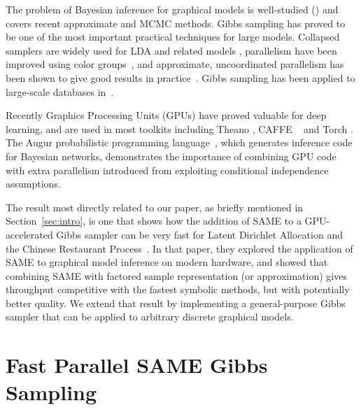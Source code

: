 \documentclass{article} %
\begin{document}
The problem of Bayesian inference for graphical models is  well-studied (\citet{Koller2009}) and \citet{Wainwright2008} covers
recent approximate and MCMC methods. Gibbs sampling has proved to be one of the most important practical
techniques for large models. Collapsed samplers are widely used for LDA and related models \cite{Griffiths_Steyvers},
parallelism have been improved using color groups~\citep{Gonzalez2011}, and approximate, uncoordinated parallelism has been
shown to give good results in practice~\citep{Johnson2013}.  Gibbs sampling has been applied
to large-scale databases in~\citep{Zhang2013}.

Recently Graphics Processing Units (GPUs) have proved valuable for
deep learning, and are used in most toolkits including Theano
\citep{Theano2012}, CAFFE ~\citep{jia2014caffe} and Torch
\cite{Torch}.  The Augur probabilistic programming
language~\citep{Augur2014}, which generates inference code for
Bayesian networks, demonstrates the importance of combining GPU code
with extra parallelism introduced from exploiting conditional
independence assumptions.

The result most directly related to our paper, as briefly mentioned in
Section~\ref{sec:intro}, is one that shows how the addition of SAME to
a GPU-accelerated Gibbs sampler can be very fast for Latent Dirichlet
Allocation and the Chinese Restaurant Process~\citep{SAME2015}. In
that paper, they explored the application of SAME to graphical model
inference on modern hardware, and showed that combining SAME with
factored sample representation (or approximation) gives throughput
competitive with the fastest symbolic methods, but with potentially
better quality. We extend that result by implementing a
general-purpose Gibbs sampler that can be applied to arbitrary
discrete graphical models.





\section{Fast Parallel SAME Gibbs Sampling}\label{sec:same}
\end{document}
